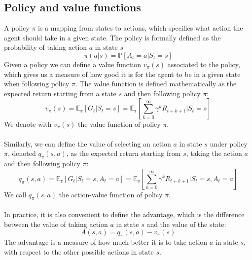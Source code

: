 \subsection{Policy and value functions}
A policy $\pi$ is a mapping from states to actions, which specifies what action the agent should take in a given state. The policy is formally defined as the probability of taking action $a$ in state $s$
\begin{equation}
    \pi(a | s) = \mathds{P}[A_t = a | S_t = s]
    \label{policy}
\end{equation}
Given a policy we can define a value function $v_{\pi}(s)$ associated to the policy, which gives us a measure of how good it is for the agent to be in a given state when following policy $\pi$. The value function is defined mathematically as the expected return starting from a state $s$ and then following policy $\pi$:
\begin{equation}
    v_{\pi}(s) = \mathds{E_{\pi}}[G_t | S_t = s] = \mathds{E_{\pi}}[\sum_{k=0}^{\infty} \gamma^k R_{t+k+1} | S_t = s]
    \label{value-function}
\end{equation}
We denote with $v_{\pi}(s)$ the value function of policy $\pi$.\\\\
Similarly, we can define the value of selecting an action $a$ in state $s$ under policy $\pi$, denoted $q_{\pi}(s, a)$, as the expected return starting from $s$, taking the action $a$ and then following policy $\pi$:
\begin{equation}
    q_{\pi}(s, a) = \mathds{E_{\pi}}[G_t | S_t = s, A_t = a] = \mathds{E_{\pi}}[\sum_{k=0}^{\infty} \gamma^k R_{t+k+1} | S_t = s, A_t = a]
    \label{action-value-function}
\end{equation}
We call $q_{\pi}(s, a)$ the action-value function of policy $\pi$.\\\\
In practice, it is also convenient to define the advantage, which is the difference between the value of taking action $a$ in state $s$ and the value of the state:
\begin{equation}
    A(s, a) = q_{\pi}(s, a) - v_{\pi}(s)
    \label{advantage}
\end{equation}
The advantage is a measure of how much better it is to take action $a$ in state $s$, with respect to the other possible actions in state $s$.\\

